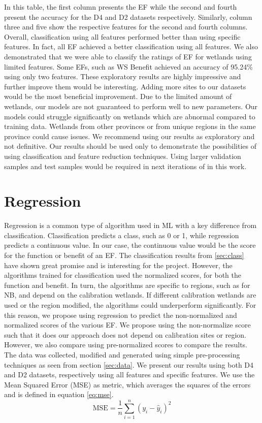 \documentclass[12pt,letterpaper]{article}
\begin{document}
In this table, the first column presents the \ac{EF} while the second and fourth present the accuracy for the D4 and D2 datasets respectively.
Similarly, column three and five show the respective features for the second and fourth columns.
Overall, classification using all features performed better than using specific features.
In fact, all \ac{EF} achieved a better classification using all features.
We also demonstrated that we were able to classify the ratings of \ac{EF} for wetlands using limited features.
Some \ac{EF}s, such as \ac{WS} Benefit achieved an accuracy of 95.24\% using only two features.
These exploratory results are highly impressive and further improve them would be interesting.
Adding more sites to our datasets would be the most beneficial improvement.
Due to the limited amount of wetlands, our models are not guaranteed to perform well to new parameters.
Our models could struggle significantly on wetlands which are abnormal compared to training data.
Wetlands from other provinces or from unique regions in the same province could cause issues.
We recommend using our results as exploratory and not definitive.
Our results should be used only to demonstrate the possibilities of using classification and feature reduction techniques.
Using larger validation samples and test samples would be required in next iterations of in this work.


\clearpage


\section{Regression}\label{sec:regression}
Regression is a common type of algorithm used in \ac{ML} with a key difference from classification.
Classification predicts a class, such as 0 or 1, while regression predicts a continuous value.
In our case, the continuous value would be the score for the function or benefit of an \ac{EF}.
The classification results from \ref{sec:class} have shown great promise and is interesting for the project.
However, the algorithms trained for classification used the normalized scores, for both the function and benefit.
In turn, the algorithms are specific to regions, such as for NB, and depend on the calibration wetlands.
If different calibration wetlands are used or the region modified, the algorithms could underperform significantly.
For this reason, we propose using regression to predict the non-normalized and normalized scores of the various \ac{EF}.
We propose using the non-normalize score such that it does our approach does not depend on calibration sites or region.
However, we also compare using pre-normalized scores to compare the results.
The data was collected, modified and generated using simple pre-processing techniques as seen from section \ref{sec:data}.
We present our results using both D4 and D2 datasets, respectively using all features and specific features.
We use the Mean Squared Error (MSE) as metric, which averages the squares of the errors and is defined in equation \ref{eq:mse}.
\begin{equation}
\text{MSE} = \frac{1}{n} \sum_{i=1}^n (y_i - \hat{y}_i)^2
\label{eq:mse}
\end{equation}
\end{document}
